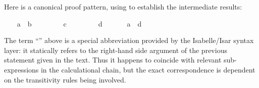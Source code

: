 \begin{isabellebody}
\begin{isamarkuptext}
  Here is a canonical proof pattern, using \hyperlink{command.have}{\mbox{}} to
  establish the intermediate results:%
\end{isamarkuptext}%
\isamarkuptrue%
%
\isadelimproof
\ \ %
\endisadelimproof
%
\isatagproof
{}\isamarkupfalse%
\ {}a\ {}\ b{}\ \isamarkupfalse%
\isanewline
\ \ \isamarkupfalse%
\ \isamarkupfalse%
\ {}{}\ {}\ c{}\ \isamarkupfalse%
\isanewline
\ \ \isamarkupfalse%
\ \isamarkupfalse%
\ {}{}\ {}\ d{}\ \isamarkupfalse%
\isanewline
\ \ \isamarkupfalse%
\ \isamarkupfalse%
\ {}a\ {}\ d{}\ \isamarkupfalse%
%
\endisatagproof
{\isafoldproof}%
%
\isadelimproof
%
\endisadelimproof
%
\begin{isamarkuptext}%
\noindent The term ``'' above is a special abbreviation
  provided by the Isabelle/Isar syntax layer: it statically refers to
  the right-hand side argument of the previous statement given in the
  text.  Thus it happens to coincide with relevant sub-expressions in
  the calculational chain, but the exact correspondence is dependent
  on the transitivity rules being involved.


\end{isamarkuptext}
\end{isabellebody}
